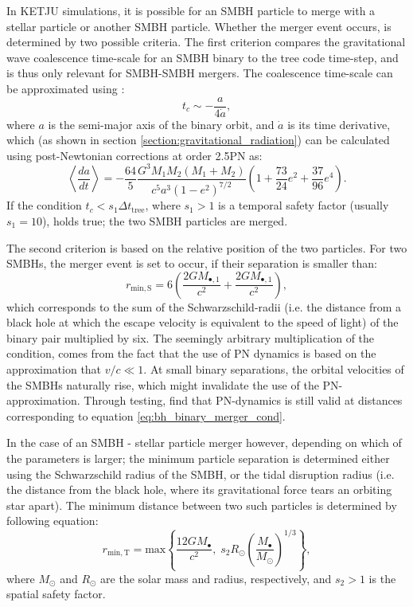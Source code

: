 \documentclass[english, twoside]{HYgradu}
\begin{document}
In KETJU simulations, it is possible for an SMBH particle to merge with a stellar particle or another SMBH particle. Whether the merger event occurs, is determined by two possible criteria. The first criterion compares the gravitational wave coalescence time-scale for an SMBH binary to the tree code time-step, and is thus only relevant for SMBH-SMBH mergers. The coalescence time-scale can be approximated using \citep{Rantala2017KETJU}:
\begin{equation}
t_c \sim -\frac{a}{4\dot{a}},
\end{equation}
where $a$ is the semi-major axis of the binary orbit, and $\dot{a}$ is its time derivative, which (as shown in section \ref{section:gravitational_radiation}) can be calculated using post-Newtonian corrections at order 2.5PN as:
\begin{equation}
\left\langle \frac{da}{dt} \right\rangle = -\frac{64}{5}\frac{G^3M_1M_2(M_1+M_2)}{c^5a^3(1-e^2)^{7/2}} \left( 1+\frac{73}{24}e^2+\frac{37}{96}e^4 \right).
\end{equation}
If the condition $t_c < s_1 \Delta t_\mathrm{tree}$, where $s_1 > 1$ is a temporal safety factor (usually $s_1 = 10$), holds true; the two SMBH particles are merged.

The second criterion is based on the relative position of the two particles. For two SMBHs, the merger event is set to occur, if their separation is smaller than: 
\begin{equation}
r_\mathrm{min,S} = 6\left( \frac{2GM_{\bullet,1}}{c^2} + \frac{2GM_{\bullet,1}}{c^2} \right), \label{eq:bh_binary_merger_cond}
\end{equation}
which corresponds to the sum of the Schwarzschild-radii (i.e. the distance from a black hole at which the escape velocity is equivalent to the speed of light) of the binary pair multiplied by six. The seemingly arbitrary multiplication of the condition, comes from the fact that the use of PN dynamics is based on the approximation that $v/c \ll 1$. At small binary separations, the orbital velocities of the SMBHs naturally rise, which might invalidate the use of the PN-approximation. Through testing, \cite{Rantala2017KETJU} find that PN-dynamics is still valid at distances corresponding to equation \ref{eq:bh_binary_merger_cond}. 

In the case of an SMBH - stellar particle merger however, depending on which of the parameters is larger; the minimum particle separation is determined either using the Schwarzschild radius of the SMBH, or the tidal disruption radius (i.e. the distance from the black hole, where its gravitational force tears an orbiting star apart). The minimum distance between two such particles is determined by following equation:
\begin{equation}
r_\mathrm{min,T} = \mathrm{max} \left\lbrace \frac{12GM_{\bullet}}{c^2}, \; s_2 R_\odot \left( \frac{M_\bullet}{M_\odot} \right)^{1/3} \right\rbrace,
\end{equation}
where $M_\odot$ and $R_\odot$ are the solar mass and radius, respectively, and $s_2 > 1$ is the spatial safety factor. 
\end{document}
